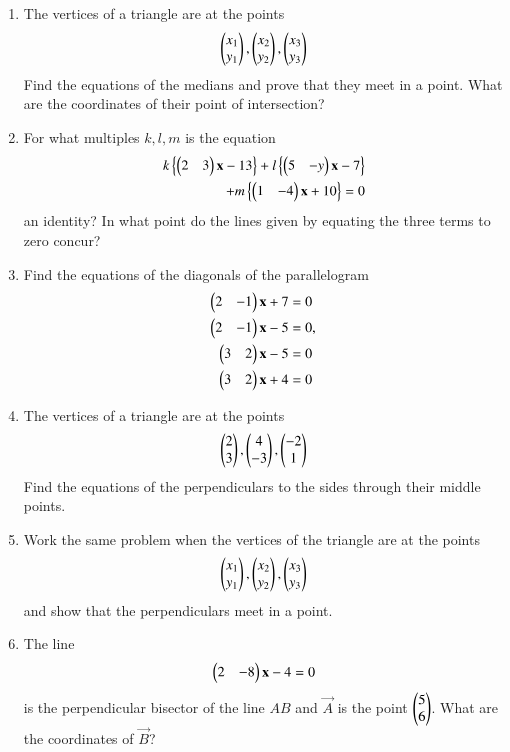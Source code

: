 \begin{enumerate}[label=\arabic*.,ref=\thesubsection.\theenumi]
%
\item The vertices of a triangle are at the points
\begin{align}
\begin{pmatrix}x_1\\y_1\end{pmatrix}, \begin{pmatrix}x_2\\y_2\end{pmatrix}, \begin{pmatrix}x_3\\y_3\end{pmatrix}
\end{align}
Find the equations of the medians and prove that they meet in a point.  What are the coordinates of their point of intersection?
\item For what multiples $k, l, m$ is the equation
\begin{align}
k\left\{\begin{pmatrix}2&3\end{pmatrix}\mathbf{x}-13\right\}+l\left\{\begin{pmatrix}5& -y\end{pmatrix}\mathbf{x}-7\right\} 
\nonumber \\ 
+ m\left\{\begin{pmatrix}1 &-4\end{pmatrix}\mathbf{x}+10\right\} = 0
\end{align}
an identity?  In what point do the lines given by equating the three terms to zero concur?
\item Find the equations of the diagonals of the parallelogram
\begin{align}
\begin{pmatrix}2&-1\end{pmatrix} \mathbf{x}+7&= 0
\\
\begin{pmatrix} 2 &-1\end{pmatrix}\mathbf{x}-5 &= 0,
\\
\begin{pmatrix} 3 &2\end{pmatrix}\mathbf{x}-5 &= 0
\\
\begin{pmatrix} 3 &2\end{pmatrix}\mathbf{x}+4&=0 
\end{align}
\renewcommand{\theequation}{\theenumi}
\item The vertices of a triangle are at the points
\begin{align}
\begin{pmatrix}2\\3\end{pmatrix}, \begin{pmatrix}4\\-3\end{pmatrix}, \begin{pmatrix}-2\\1\end{pmatrix}
\end{align}
Find the equations of the perpendiculars to the sides through their middle points.
\item Work the same problem when the vertices of the triangle are at the points
\begin{align}
\begin{pmatrix}x_1\\y_1\end{pmatrix}, \begin{pmatrix}x_2\\y_2\end{pmatrix}, \begin{pmatrix}x_3\\y_3\end{pmatrix}
\end{align}
and show that the perpendiculars meet in a point.
\item The line
\begin{align}
\begin{pmatrix}2 &-8\end{pmatrix}\mathbf{x}-4=0
\end{align}
is the perpendicular bisector of the line $AB$ and $\vec{A}$ is the point $\begin{pmatrix}5\\6\end{pmatrix}$. What are the coordinates of $\vec{B}$?
\end{enumerate}
